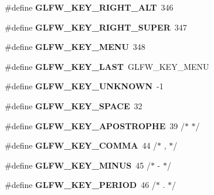 \begin{DoxyCompactItemize}
\mbox{\label{group__keys_ga687b38009131cfdd07a8d05fff8fa446}} 
\#define {\bfseries G\+L\+F\+W\+\_\+\+K\+E\+Y\+\_\+\+R\+I\+G\+H\+T\+\_\+\+A\+LT}~346
\item 
\mbox{\label{group__keys_gad4547a3e8e247594acb60423fe6502db}} 
\#define {\bfseries G\+L\+F\+W\+\_\+\+K\+E\+Y\+\_\+\+R\+I\+G\+H\+T\+\_\+\+S\+U\+P\+ER}~347
\item 
\mbox{\label{group__keys_ga9845be48a745fc232045c9ec174d8820}} 
\#define {\bfseries G\+L\+F\+W\+\_\+\+K\+E\+Y\+\_\+\+M\+E\+NU}~348
\item 
\mbox{\label{group__keys_ga442cbaef7bfb9a4ba13594dd7fbf2789}} 
\#define {\bfseries G\+L\+F\+W\+\_\+\+K\+E\+Y\+\_\+\+L\+A\+ST}~G\+L\+F\+W\+\_\+\+K\+E\+Y\+\_\+\+M\+E\+NU
\item 
\mbox{\label{group__keys_ga99aacc875b6b27a072552631e13775c7}} 
\#define {\bfseries G\+L\+F\+W\+\_\+\+K\+E\+Y\+\_\+\+U\+N\+K\+N\+O\+WN}~-\/1
\item 
\mbox{\label{group__keys_gaddb2c23772b97fd7e26e8ee66f1ad014}} 
\#define {\bfseries G\+L\+F\+W\+\_\+\+K\+E\+Y\+\_\+\+S\+P\+A\+CE}~32
\item 
\mbox{\label{group__keys_ga6059b0b048ba6980b6107fffbd3b4b24}} 
\#define {\bfseries G\+L\+F\+W\+\_\+\+K\+E\+Y\+\_\+\+A\+P\+O\+S\+T\+R\+O\+P\+HE}~39  /$\ast$ \textquotesingle{} $\ast$/
\item 
\mbox{\label{group__keys_gab3d5d72e59d3055f494627b0a524926c}} 
\#define {\bfseries G\+L\+F\+W\+\_\+\+K\+E\+Y\+\_\+\+C\+O\+M\+MA}~44  /$\ast$ , $\ast$/
\item 
\mbox{\label{group__keys_gac556b360f7f6fca4b70ba0aecf313fd4}} 
\#define {\bfseries G\+L\+F\+W\+\_\+\+K\+E\+Y\+\_\+\+M\+I\+N\+US}~45  /$\ast$ -\/ $\ast$/
\item 
\mbox{\label{group__keys_ga37e296b650eab419fc474ff69033d927}} 
\#define {\bfseries G\+L\+F\+W\+\_\+\+K\+E\+Y\+\_\+\+P\+E\+R\+I\+OD}~46  /$\ast$ . $\ast$/
\item 
\mbox{\label{group__keys_gadf3d753b2d479148d711de34b83fd0db}} 

\end{DoxyCompactItemize}
